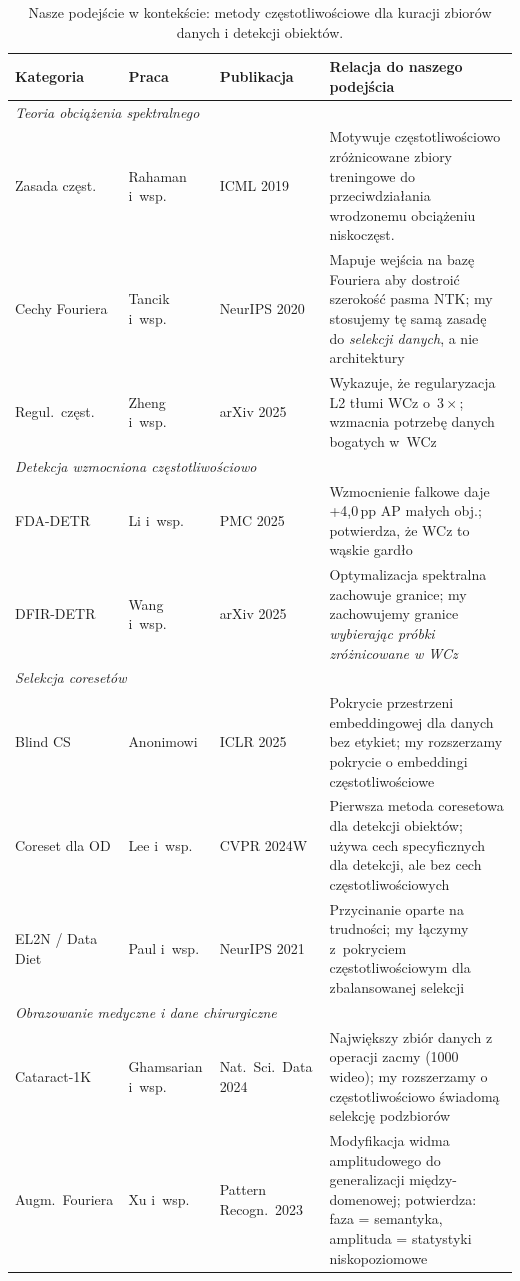 \begin{table}[t]
\centering
\caption{Nasze podejście w kontekście: metody częstotliwościowe dla kuracji
         zbiorów danych i detekcji obiektów.}
\label{tab:related_work}
\begin{tabular}{p{3.2cm}p{2.5cm}p{3cm}p{5.5cm}}
\toprule
\textbf{Kategoria} & \textbf{Praca} & \textbf{Publikacja} &
    \textbf{Relacja do naszego podejścia} \\
\midrule
\multicolumn{4}{l}{\textit{Teoria obciążenia spektralnego}} \\
\quad Zasada częst.
    & Rahaman i~wsp.
    & ICML 2019
    & Motywuje częstotliwościowo zróżnicowane zbiory treningowe
      do przeciwdziałania wrodzonemu obciążeniu niskoczęst. \\[3pt]
\quad Cechy Fouriera
    & Tancik i~wsp.
    & NeurIPS 2020
    & Mapuje wejścia na bazę Fouriera aby dostroić szerokość pasma
      NTK; my stosujemy tę samą zasadę do \emph{selekcji danych},
      a nie architektury \\[3pt]
\quad Regul.\ częst.
    & Zheng i~wsp.
    & arXiv 2025
    & Wykazuje, że regularyzacja L2 tłumi WCz o~$3\times$; wzmacnia
      potrzebę danych bogatych w~WCz \\[3pt]
\midrule
\multicolumn{4}{l}{\textit{Detekcja wzmocniona częstotliwościowo}} \\
\quad FDA-DETR
    & Li i~wsp.
    & PMC 2025
    & Wzmocnienie falkowe daje +4{,}0\,pp AP małych obj.;
      potwierdza, że WCz to wąskie gardło \\[3pt]
\quad DFIR-DETR
    & Wang i~wsp.
    & arXiv 2025
    & Optymalizacja spektralna zachowuje granice; my zachowujemy
      granice \emph{wybierając próbki zróżnicowane w WCz} \\[3pt]
\midrule
\multicolumn{4}{l}{\textit{Selekcja coresetów}} \\
\quad Blind CS
    & Anonimowi
    & ICLR 2025
    & Pokrycie przestrzeni embeddingowej dla danych bez etykiet; my
      rozszerzamy pokrycie o embeddingi częstotliwościowe \\[3pt]
\quad Coreset dla OD
    & Lee i~wsp.
    & CVPR 2024W
    & Pierwsza metoda coresetowa dla detekcji obiektów; używa cech
      specyficznych dla detekcji, ale bez cech częstotliwościowych \\[3pt]
\quad EL2N / Data Diet
    & Paul i~wsp.
    & NeurIPS 2021
    & Przycinanie oparte na trudności; my łączymy z~pokryciem
      częstotliwościowym dla zbalansowanej selekcji \\[3pt]
\midrule
\multicolumn{4}{l}{\textit{Obrazowanie medyczne i dane chirurgiczne}} \\
\quad Cataract-1K
    & Ghamsarian i~wsp.
    & Nat.\ Sci.\ Data 2024
    & Największy zbiór danych z operacji zacmy (1000 wideo); my
      rozszerzamy o częstotliwościowo świadomą selekcję podzbiorów \\[3pt]
\quad Augm.\ Fouriera
    & Xu i~wsp.
    & Pattern Recogn.\ 2023
    & Modyfikacja widma amplitudowego do generalizacji między-domenowej;
      potwierdza: faza = semantyka, amplituda = statystyki
      niskopoziomowe \\
\bottomrule
\end{tabular}
\end{table}

